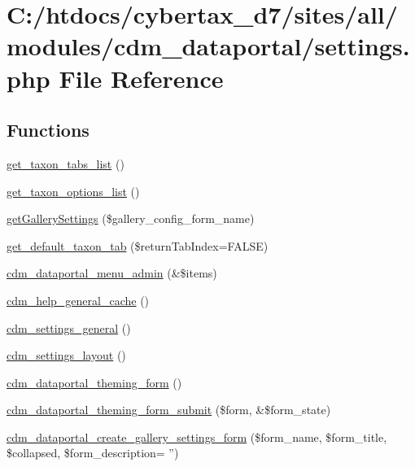 \hypertarget{settings_8php}{\section{C\-:/htdocs/cybertax\-\_\-d7/sites/all/modules/cdm\-\_\-dataportal/settings.php File Reference}
\label{settings_8php}
}
\subsection*{Functions}
\begin{DoxyCompactItemize}
\item 
\hyperlink{settings_8php_a8824b906ed3a77e5d4d5e43086a3b0f8}{get\-\_\-taxon\-\_\-tabs\-\_\-list} ()
\item 
\hyperlink{settings_8php_a4d07113672784863c05b954f12ee136d}{get\-\_\-taxon\-\_\-options\-\_\-list} ()
\item 
\hyperlink{settings_8php_adf7b27ac5925d0af4ca5e2077a6b2684}{get\-Gallery\-Settings} (\$gallery\-\_\-config\-\_\-form\-\_\-name)
\item 
\hyperlink{settings_8php_a9fb7880dd8b1a24fd79648df6b94fae5}{get\-\_\-default\-\_\-taxon\-\_\-tab} (\$return\-Tab\-Index=F\-A\-L\-S\-E)
\item 
\hyperlink{settings_8php_aa66904455bb5f27f3ad3700b0bc78458}{cdm\-\_\-dataportal\-\_\-menu\-\_\-admin} (\&\$items)
\item 
\hyperlink{settings_8php_a8b8883e7f2174714bd52dea3cc88abd3}{cdm\-\_\-help\-\_\-general\-\_\-cache} ()
\item 
\hyperlink{settings_8php_a963379db4847cd2c217383b5525e84d8}{cdm\-\_\-settings\-\_\-general} ()
\item 
\hyperlink{settings_8php_a4d4f1fa0b7987f310c511a2846e381d0}{cdm\-\_\-settings\-\_\-layout} ()
\item 
\hyperlink{settings_8php_accc017467fb7da89f7fc9907c81cac95}{cdm\-\_\-dataportal\-\_\-theming\-\_\-form} ()
\item 
\hyperlink{settings_8php_a63349f5d3061b3bc12df0887a8edc17a}{cdm\-\_\-dataportal\-\_\-theming\-\_\-form\-\_\-submit} (\$form, \&\$form\-\_\-state)
\item 
\hyperlink{settings_8php_a78861abbb3fbc421ab3e1ed42f6ef9d8}{cdm\-\_\-dataportal\-\_\-create\-\_\-gallery\-\_\-settings\-\_\-form} (\$form\-\_\-name, \$form\-\_\-title, \$collapsed, \$form\-\_\-description= '')
\item 

\end{DoxyCompactItemize}
